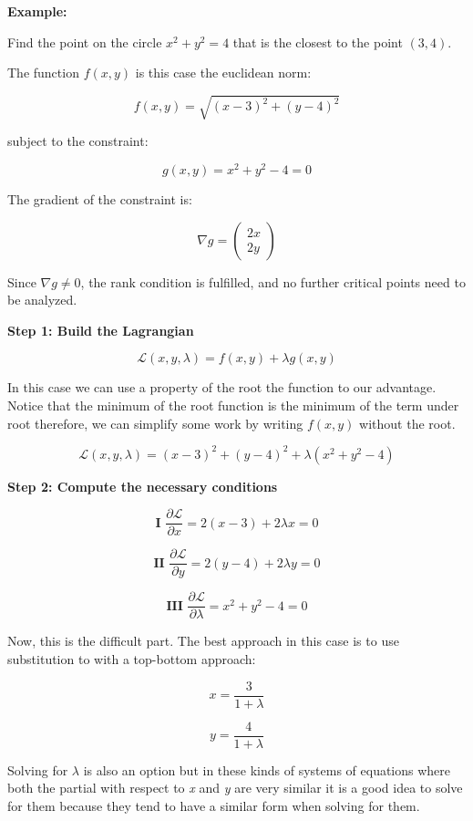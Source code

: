 \textbf{Example:}
\vspace{\baselineskip}

Find the point on the circle \(x^2 + y^2 = 4\) that is the closest to the point \((3,4)\).
\vspace{\baselineskip}

The function \(f(x,y)\) is this case the euclidean norm:

\[
    f(x, y) = \sqrt{(x - 3)^2 + (y - 4)^2}
\]

subject to the constraint:

\[
    g(x, y) = x^2 + y^2 - 4 = 0
\]

The gradient of the constraint is:

\[
    \nabla g = \begin{pmatrix} 2x \\ 2y \end{pmatrix}
\]

Since \( \nabla g \ne 0 \), the rank condition is fulfilled, and no further critical points 
need to be analyzed.
\vspace{\baselineskip}

\textbf{Step 1: Build the Lagrangian}

\[
    \mathcal{L}(x, y, \lambda) = f(x, y) + \lambda g(x, y)
\]

In this case we can use a property of the root the function to our advantage. Notice that the minimum 
of the root function is the minimum of the term under root therefore, we can simplify some work by writing 
\(f(x,y)\) without the root. 

\[
    \mathcal{L}(x, y, \lambda) = (x - 3)^2 + (y - 4)^2 + \lambda (x^2 + y^2 - 4)
\]

\textbf{Step 2: Compute the necessary conditions}

\[
    \textbf{I } \frac{\partial \mathcal{L}}{\partial x} = 2(x - 3) + 2\lambda x = 0
\]

\[
    \textbf{II } \frac{\partial \mathcal{L}}{\partial y} = 2(y - 4) + 2\lambda y = 0
\]

\[
    \textbf{III } \frac{\partial \mathcal{L}}{\partial \lambda} = x^2 + y^2 - 4 = 0
\]

Now, this is the difficult part. The best approach in this case is to use substitution to 
with a top-bottom approach:

\[
    x = \frac{3}{1 + \lambda}
\]

\[
    y = \frac{4}{1 + \lambda}
\]

Solving for \(\lambda\) is also an option but in these kinds of systems of equations where 
both the partial with respect to \emph{x} and \emph{y} are very similar it is a good idea to solve for them 
because they tend to have a similar form when solving for them.

